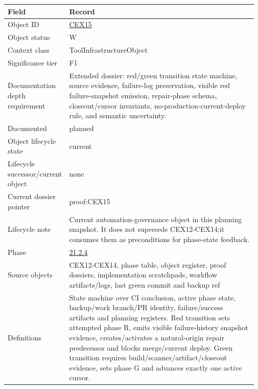 \begin{longtable}{L{0.16\linewidth} L{0.81\linewidth}}
\hline
\textbf{Field} & \textbf{Record}\\
\hline
Object ID & \hyperlink{object-row-CEX15}{CEX15}\\
\hline\addlinespace[0.20em]
Object status & W\\
\hline\addlinespace[0.20em]
Context class & ToolInfrastructureObject\\
\hline\addlinespace[0.20em]
Significance tier & F1\\
\hline\addlinespace[0.20em]
Documentation depth requirement & Extended dossier: red/\allowbreak{}green transition state machine, source evidence, failure-log preservation, visible red failure-snapshot emission, repair-phase schema, closeout/\allowbreak{}cursor invariants, no-production-current-deploy rule, and semantic uncertainty.\\
\hline\addlinespace[0.20em]
Documented & planned\\
\hline\addlinespace[0.20em]
Object lifecycle state & current\\
\hline\addlinespace[0.20em]
Lifecycle successor/\allowbreak{}current object & none\\
\hline\addlinespace[0.20em]
Current dossier pointer & proof:CEX15\\
\hline\addlinespace[0.20em]
Lifecycle note & Current automation-governance object in this planning snapshot. It does not supersede CEX12-CEX14;\newline it consumes them as preconditions for phase-state feedback.\\
\hline\addlinespace[0.20em]
Phase & \hyperlink{phase-row-21-2-4}{21.2.4}\\
\hline\addlinespace[0.20em]
Source objects & CEX12-CEX14, phase table, object register, proof dossiers, implementation scratchpads, workflow artifacts/\allowbreak{}logs, last green commit and backup ref\\
\hline\addlinespace[0.20em]
Definitions & State machine over CI conclusion, active phase state, backup/\allowbreak{}work branch/\allowbreak{}PR identity, failure/\allowbreak{}success artifacts and planning registers. Red transition sets attempted phase R, emits visible failure-history snapshot evidence, creates/\allowbreak{}activates a natural-origin repair predecessor and blocks merge/\allowbreak{}current deploy. Green transition requires build/\allowbreak{}scanner/\allowbreak{}artifact/\allowbreak{}closeout evidence, sets phase G and advances exactly one active cursor.\\

\end{longtable}
